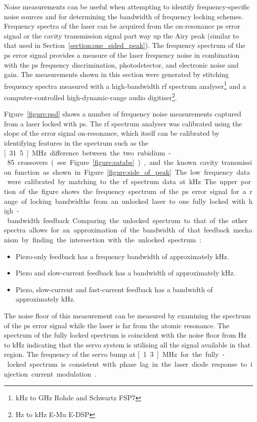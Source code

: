 Noise measurements can be useful when attempting to identify frequency-specific noise sources and for determining the bandwidth of frequency locking schemes.
Frequency spectra of the laser can be acquired from the on-resonance \gls{ps} error signal or the cavity transmission signal part way up the Airy peak (similar to that used in Section~\ref{section:one_sided_peak}).
The frequency spectrum of the \gls{ps} error signal provides a measure of the laser frequency noise in combination with the \gls{ps} frequency discrimination, photodetector, and electronic noise and gain.
The measurements shown in this section were generated by stitching frequency spectra measured with a high-bandwidth \gls{rf} spectrum analyser\footnote{\unit[9]{kHz} to \unit[7]{GHz} Rohde and Schwartz FSP7} and a computer-controlled high-dynamic-range audio digitiser\footnote{\unit[24]{Hz} to \unit[100]{kHz} E-Mu E-DSP}.

Figure~\ref{figure:psd} shows a number of frequency noise measurements captured from a laser locked with \gls{ps}.
The \gls{rf} spectrum analyser was calibrated using the slope of the error signal on-resonance, which itself can be calibrated by identifying features in the spectrum such as the \unit[31.5]{MHz} difference between the two rubidium-85 crossovers (see Figure~\ref{figure:satabs}), and the known cavity transmission function as shown in Figure~\ref{figure:side_of_peak}.
The low frequency data were calibrated by matching to the \gls{rf} spectrum data at \unit[10]{kHz}.
The upper portion of the figure shows the frequency spectrum of the \gls{ps} error signal for a range of locking bandwidths from an unlocked laser to one fully locked with high-bandwidth feedback.
Comparing the unlocked spectrum to that of the other spectra allows for an approximation of the bandwidth of that feedback mechanism by finding the intersection with the unlocked spectrum:
\begin{itemize}
    \item Piezo-only feedback has a frequency bandwidth of approximately \unit[1]{kHz}.
    \item Piezo and slow-current feedback has a bandwidth of approximately \unit[50]{kHz}.
    \item Piezo, slow-current and fast-current feedback has a bandwidth of approximately \unit[500]{kHz}.
\end{itemize}
The noise floor of this measurement can be measured by examining the spectrum of the \gls{ps} error signal while the laser is far from the atomic resonance.
The spectrum of the fully locked spectrum is coincident with the noise floor from \unit[450]{Hz} to \unit[350]{kHz} indicating that the servo system is utilising all the signal available in that region.
The frequency of the servo bump at \unit[1.3]{MHz} for the fully-locked spectrum is consistent with phase lag in the laser diode response to injection current modulation~\cite{wieman_using_1991}.

